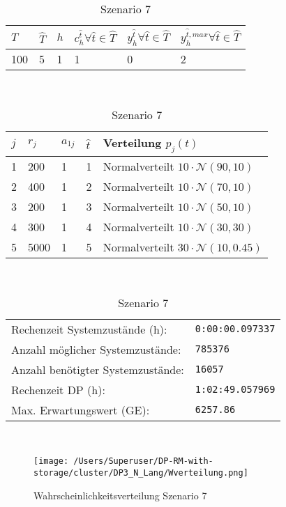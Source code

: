 \begin{table}[h!]
\renewcommand{\arraystretch}{1.5}
  \begin{center}
    \caption{Szenario 7}  \label{S7}
    \vspace*{3mm}
    \begin{tabular}{l l l l l l}   %
    $T$ & $\hat T$  & $h$ & $c_h^{\hat t}\forall \hat{t}\in{\hat T}$ & $y_h^{\hat t}\forall \hat{t}\in{\hat T}$  & $y_h^{{\hat t},max}\forall \hat{t}\in{\hat T}$  \\  \hline
100 & 5 & 1 & 1 & 0 & 2  \\ \hline
    \end{tabular} \\[3mm]
        \begin{tabular}{p{1cm} p{1cm} p{1cm}  p{1cm} p{6cm}}   %
    $j$ & $r_j$  & $a_{1j}$ & $\hat t$ & Verteilung $p_j(t)$ \\  \hline
1 & 200 & 1 & 1 & Normalverteilt $10\cdot\mathcal{N}(90, 10)$   \\
2 & 400 & 1 & 2 & Normalverteilt $10\cdot\mathcal{N}(70, 10)$  \\
3 & 200 & 1 & 3 & Normalverteilt $10\cdot\mathcal{N}(50, 10)$  \\
4 & 300 & 1 & 4 & Normalverteilt $10\cdot\mathcal{N}(30, 30)$  \\
5 & 5000 & 1 & 5 & Normalverteilt $30\cdot\mathcal{N}(10, 0.45)$ \\
\hline
    \end{tabular} \\[3mm]
     \begin{tabular}{p{7cm}p{5cm}} \hline
     Rechenzeit Systemzustände (h): & \texttt{0:00:00.097337} \\
     Anzahl möglicher Systemzustände: & \texttt{785376} \\
     Anzahl benötigter Systemzustände: & \texttt{16057} \\ 
     Rechenzeit DP (h): & \texttt{1:02:49.057969} \\ 
          Max. Erwartungswert (GE): & \texttt{6257.86} \\ \hline
         \end{tabular} \\[3mm]
  \end{center}
\end{table}

\begin{figure}[h!]
  \begin{center}
    \texttt{[image: /Users/Superuser/DP-RM-with-storage/cluster/DP3\_N\_Lang/Wverteilung.png]}
    \caption{Wahrscheinlichkeitsverteilung Szenario 7}  \label{SB7}
  \end{center}
\end{figure}

